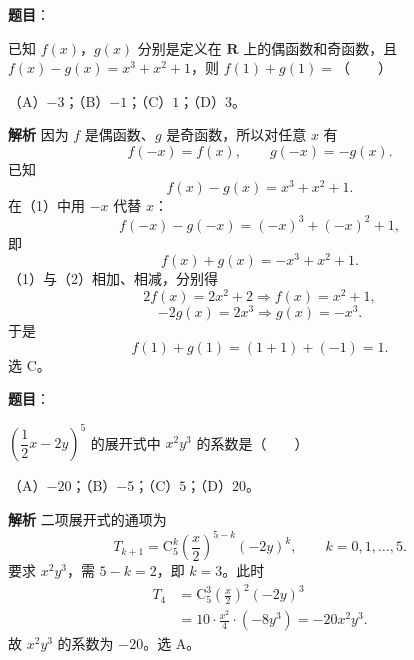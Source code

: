 \begin{answer}

\textbf{题目}：

已知 $f(x)$，$g(x)$ 分别是定义在 $\mathbf R$ 上的偶函数和奇函数，且 $f(x)-g(x)=x^3+x^2+1$，则 $f(1)+g(1)=$\mbox{（　　）}

（A）$-3$；（B）$-1$；（C）$1$；（D）$3$。

\textbf{解析}
因为 $f$ 是偶函数、$g$ 是奇函数，所以对任意 $x$ 有
\nopagebreak[4]
\[f(-x)=f(x),\qquad g(-x)=-g(x).\]
已知
\nopagebreak[4]
\[f(x)-g(x)=x^3+x^2+1 . \tag{1}\]
在（1）中用 $-x$ 代替 $x$：
\nopagebreak[4]
\[f(-x)-g(-x)=(-x)^3+(-x)^2+1,\]
即
\nopagebreak[4]
\[f(x)+g(x)=-x^3+x^2+1 . \tag{2}\]
（1）与（2）相加、相减，分别得
\nopagebreak[4]
\[2f(x)=2x^2+2\Longrightarrow f(x)=x^2+1,\]
\nopagebreak[4]
\[-2g(x)=2x^3\Longrightarrow g(x)=-x^3 .\]
于是
\nopagebreak[4]
\[f(1)+g(1)=(1+1)+(-1)=1 .\]
选 C。


\end{answer}
\begin{answer}

\textbf{题目}：

$\left(\dfrac12x-2y\right)^5$ 的展开式中 $x^2y^3$ 的系数是\mbox{（　　）}

（A）$-20$；（B）$-5$；（C）$5$；（D）$20$。

\textbf{解析}
二项展开式的通项为
\nopagebreak[4]
\[T_{k+1}=\mathrm C_5^k\left(\frac x2\right)^{5-k}(-2y)^k,\qquad k=0,1,\dots,5 .\]
要求 $x^2y^3$，需 $5-k=2$，即 $k=3$。此时
\nopagebreak[4]
\[\begin{aligned}
T_4&=\mathrm C_5^3\left(\frac x2\right)^2(-2y)^3\\
&=10\cdot\frac{x^2}4\cdot(-8y^3)=-20x^2y^3 .
\end{aligned}\]
故 $x^2y^3$ 的系数为 $-20$。选 A。


\end{answer}
